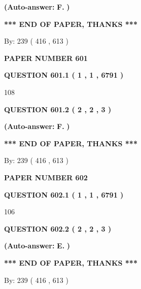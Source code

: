 \documentclass{ctexart}
\begin{document}
 
{\textbf{(Auto-answer:}}
{\textbf{\large{
F.}}}
{\textbf{)}}
 
 
   
   
   
   
\vspace{1.0in} 
{\textbf{\large{ *** END OF PAPER, THANKS *** }}} 
   
   
\hspace{1.0in} By: 
 239 ( 416 ,  613 )
   
   
   
   
\newpage 
\setcounter{page}{ 
   601001 } 
   
   
 {\textbf{ \Large{ PAPER NUMBER  601  }}}
   
   
   
   
  
  
{\textbf{\large{QUESTION
601.1 
 ( 1 , 1 , 6791 )
}}}

108
  
  
{\textbf{\large{QUESTION
601.2 
 ( 2 , 2 , 3 )
}}}
 
 
{\textbf{(Auto-answer:}}
{\textbf{\large{
F.}}}
{\textbf{)}}
 
 
   
   
   
   
\vspace{1.0in} 
{\textbf{\large{ *** END OF PAPER, THANKS *** }}} 
   
   
\hspace{1.0in} By: 
 239 ( 416 ,  613 )
   
   
   
   
\newpage 
\setcounter{page}{ 
   602001 } 
   
   
 {\textbf{ \Large{ PAPER NUMBER  602  }}}
   
   
   
   
  
  
{\textbf{\large{QUESTION
602.1 
 ( 1 , 1 , 6791 )
}}}

106
  
  
{\textbf{\large{QUESTION
602.2 
 ( 2 , 2 , 3 )
}}}
 
 
{\textbf{(Auto-answer:}}
{\textbf{\large{
E.}}}
{\textbf{)}}
 
 
   
   
   
   
\vspace{1.0in} 
{\textbf{\large{ *** END OF PAPER, THANKS *** }}} 
   
   
\hspace{1.0in} By: 
 239 ( 416 ,  613 )
   
   
   
\end{document}
